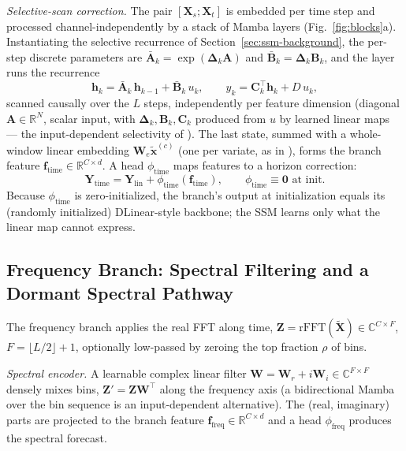 \documentclass[review,12pt]{elsarticle}
\begin{document}
\emph{Selective-scan correction.} The pair $[\mathbf{X}_s; \mathbf{X}_t]$
is embedded per time step and processed channel-independently by a stack
of Mamba layers \cite{mamba} (Fig.~\ref{fig:blocks}a). Instantiating the
selective recurrence of Section~\ref{sec:ssm-background}, the per-step
discrete parameters are
$\bar{\mathbf{A}}_k = \exp(\boldsymbol{\Delta}_k \mathbf{A})$ and
$\bar{\mathbf{B}}_k = \boldsymbol{\Delta}_k \mathbf{B}_k$, and the layer
runs the recurrence
\begin{equation}
\mathbf{h}_k = \bar{\mathbf{A}}_k\,\mathbf{h}_{k-1} +
\bar{\mathbf{B}}_k\, u_k, \qquad
y_k = \mathbf{C}_k^{\top} \mathbf{h}_k + D\, u_k ,
\label{eq:ssm}
\end{equation}
scanned causally over the $L$ steps, independently per feature dimension
(diagonal $\mathbf{A}\in\mathbb{R}^{N}$, scalar input, with
$\boldsymbol{\Delta}_k,\mathbf{B}_k,\mathbf{C}_k$ produced from $u$ by learned
linear maps --- the input-dependent selectivity of \cite{mamba}). The last
state, summed
with a whole-window linear embedding $\mathbf{W}_e \tilde{\mathbf{x}}^{(c)}$
(one per variate, as in \cite{smamba}), forms the branch feature
$\mathbf{f}_{\mathrm{time}} \in \mathbb{R}^{C \times d}$. A head
$\phi_{\mathrm{time}}$ maps features to a horizon correction:
\begin{equation}
\mathbf{Y}_{\mathrm{time}} = \mathbf{Y}_{\mathrm{lin}} +
\phi_{\mathrm{time}}(\mathbf{f}_{\mathrm{time}}), \qquad
\phi_{\mathrm{time}} \equiv \mathbf{0} \text{ at init.}
\label{eq:timezero}
\end{equation}
Because $\phi_{\mathrm{time}}$ is zero-initialized, the branch's output at
initialization equals its (randomly initialized) DLinear-style backbone;
the SSM learns only what the linear map cannot express.

\subsection{Frequency Branch: Spectral Filtering and a Dormant Spectral Pathway}
\label{sec:freq}

The frequency branch applies the real FFT along time,
$\mathbf{Z} = \mathrm{rFFT}(\tilde{\mathbf{X}}) \in
\mathbb{C}^{C \times F}$, $F = \lfloor L/2 \rfloor + 1$, optionally
low-passed by zeroing the top fraction $\rho$ of bins.

\emph{Spectral encoder.} A learnable complex linear filter
$\mathbf{W} = \mathbf{W}_r + i\mathbf{W}_i \in \mathbb{C}^{F \times F}$
densely mixes bins, $\mathbf{Z}' = \mathbf{Z}\mathbf{W}^{\top}$ along the
frequency axis (a bidirectional Mamba over the bin sequence is an
input-dependent alternative). The (real, imaginary) parts are projected to
the branch feature $\mathbf{f}_{\mathrm{freq}} \in \mathbb{R}^{C \times d}$
and a head $\phi_{\mathrm{freq}}$ produces the spectral forecast.
\end{document}
